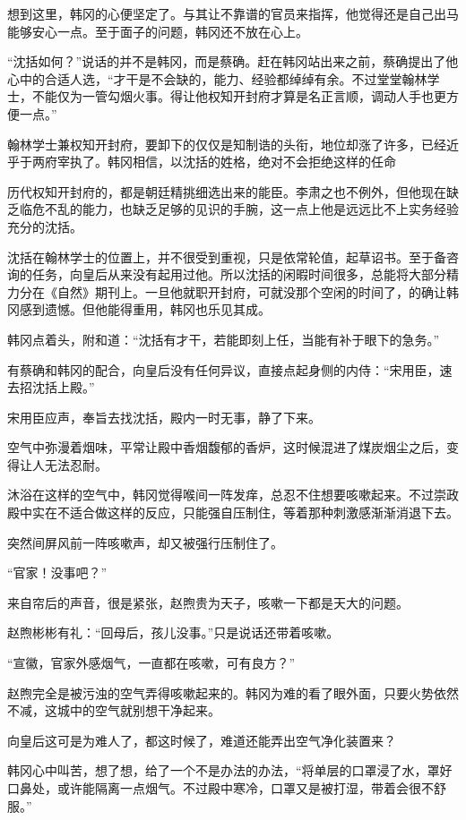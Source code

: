 想到这里，韩冈的心便坚定了。与其让不靠谱的官员来指挥，他觉得还是自己出马能够安心一点。至于面子的问题，韩冈还不放在心上。

“沈括如何？”说话的并不是韩冈，而是蔡确。赶在韩冈站出来之前，蔡确提出了他心中的合适人选，“才干是不会缺的，能力、经验都绰绰有余。不过堂堂翰林学士，不能仅为一管勾烟火事。得让他权知开封府才算是名正言顺，调动人手也更方便一点。”

翰林学士兼权知开封府，要卸下的仅仅是知制诰的头衔，地位却涨了许多，已经近乎于两府宰执了。韩冈相信，以沈括的姓格，绝对不会拒绝这样的任命

历代权知开封府的，都是朝廷精挑细选出来的能臣。李肃之也不例外，但他现在缺乏临危不乱的能力，也缺乏足够的见识的手腕，这一点上他是远远比不上实务经验充分的沈括。

沈括在翰林学士的位置上，并不很受到重视，只是依常轮值，起草诏书。至于备咨询的任务，向皇后从来没有起用过他。所以沈括的闲暇时间很多，总能将大部分精力分在《自然》期刊上。一旦他就职开封府，可就没那个空闲的时间了，的确让韩冈感到遗憾。但他能得重用，韩冈也乐见其成。

韩冈点着头，附和道：“沈括有才干，若能即刻上任，当能有补于眼下的急务。”

有蔡确和韩冈的配合，向皇后没有任何异议，直接点起身侧的内侍：“宋用臣，速去招沈括上殿。”

宋用臣应声，奉旨去找沈括，殿内一时无事，静了下来。

空气中弥漫着烟味，平常让殿中香烟馥郁的香炉，这时候混进了煤炭烟尘之后，变得让人无法忍耐。

沐浴在这样的空气中，韩冈觉得喉间一阵发痒，总忍不住想要咳嗽起来。不过崇政殿中实在不适合做这样的反应，只能强自压制住，等着那种刺激感渐渐消退下去。

突然间屏风前一阵咳嗽声，却又被强行压制住了。

“官家！没事吧？”

来自帘后的声音，很是紧张，赵煦贵为天子，咳嗽一下都是天大的问题。

赵煦彬彬有礼：“回母后，孩儿没事。”只是说话还带着咳嗽。

“宣徽，官家外感烟气，一直都在咳嗽，可有良方？”

赵煦完全是被污浊的空气弄得咳嗽起来的。韩冈为难的看了眼外面，只要火势依然不减，这城中的空气就别想干净起来。

向皇后这可是为难人了，都这时候了，难道还能弄出空气净化装置来？

韩冈心中叫苦，想了想，给了一个不是办法的办法，“将单层的口罩浸了水，罩好口鼻处，或许能隔离一点烟气。不过殿中寒冷，口罩又是被打湿，带着会很不舒服。”

